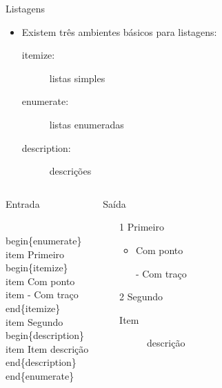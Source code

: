 \documentclass{beamer}
\begin{document}
\begin{frame}[fragile]{Listagens}
    \begin{itemize}
    \item Existem três ambientes básicos para listagens:
        \begin{description}
        \item[itemize:] listas simples
        \item[enumerate:] listas enumeradas
        \item[description:] descrições
        \end{description}
    \end{itemize}
    
    \begin{columns}
        \begin{block}{Entrada}
            \begin{semiverbatim}
\footnotesize{}\\begin\{enumerate\}
\\item Primeiro
  \\begin\{itemize\}
  \\item Com ponto
  \\item[-] Com traço
  \\end\{itemize\}
\\item Segundo
  \\begin\{description\}
  \\item[Item] descrição
  \\end\{description\}
\\end\{enumerate\}
\end{semiverbatim}
        \end{block}
    
        \begin{block}{Saída}
            \begin{enumerate}
            \item[1] Primeiro
            \begin{itemize}
            \item Com ponto
            \item[-] Com traço
            \end{itemize}
            \item[2] Segundo
            \begin{description}
            \item[Item] descrição
            \end{description}            
            \end{enumerate}
        \end{block}
    \end{columns}
\end{frame}
\end{document}
